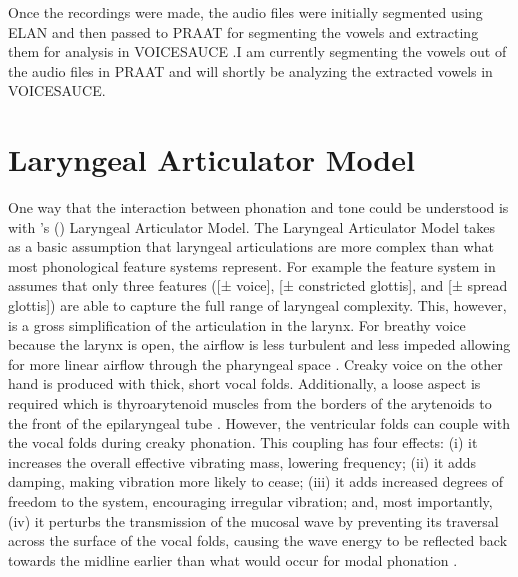 \documentclass[12pt, letterpaper]{article}
\begin{document}
Once the recordings were made, the audio files were initially segmented using ELAN \citep{wittenburgELANProfessionalFramework2006} and then passed to PRAAT \citep{boersmaPraatDoingPhonetics2021} for segmenting the vowels and extracting them for analysis in VOICESAUCE \citep{shueVOICESAUCEProgramVoice2009}.I am currently segmenting the vowels out of the audio files in PRAAT and will shortly be analyzing the extracted vowels in VOICESAUCE. 

\section{Laryngeal Articulator Model} \label{sec:LAM}

One way that the interaction between phonation and tone could be understood is with \citeauthor{eslingVoiceQualityLaryngeal2019}'s (\citeyear{eslingVoiceQualityLaryngeal2019}) Laryngeal Articulator Model. The Laryngeal Articulator Model takes as a basic assumption that laryngeal articulations are more complex than what most phonological feature systems represent. For example the feature system in \citet{hayesIntroductoryPhonology2009} assumes that only three features ([± voice], [± constricted glottis], and [± spread glottis]) are able to capture the full range of laryngeal complexity. This, however, is a gross simplification of the articulation in the larynx. For breathy voice because the larynx is open, the airflow is less turbulent and less impeded allowing for more linear airflow through the pharyngeal space \citep[56]{eslingVoiceQualityLaryngeal2019}. Creaky voice on the other hand is produced with thick, short vocal folds. Additionally, a loose aspect is required which is thyroarytenoid muscles from the borders of the arytenoids to the front of the epilaryngeal tube \citet[63]{eslingVoiceQualityLaryngeal2019}. However, the ventricular folds can couple with the vocal folds during creaky phonation. This coupling has four effects: (i) it increases the overall effective vibrating mass, lowering frequency; (ii) it adds damping, making vibration more likely to cease; (iii) it adds increased degrees of freedom to the system, encouraging irregular vibration; and, most importantly, (iv) it perturbs the transmission of the mucosal wave by preventing its traversal across the surface of the vocal folds, causing the wave energy to be reflected back towards the midline earlier than what would occur for modal phonation \citep[63]{eslingVoiceQualityLaryngeal2019}. 
\end{document}
